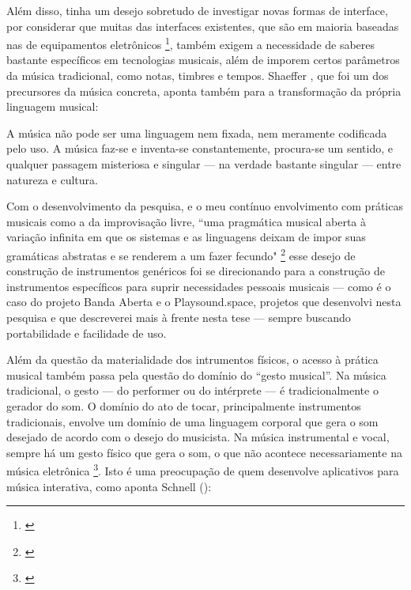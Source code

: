  Além disso, tinha um desejo sobretudo de investigar novas formas de interface, por considerar que muitas das interfaces existentes, que são em maioria baseadas nas de equipamentos eletrônicos \footnote{\cite{Stolfi2016}}, também exigem a necessidade de saberes bastante específicos em tecnologias musicais, além de imporem certos parâmetros da música tradicional, como notas, timbres e tempos. Shaeffer \citeyear{Schaeffer2007}, que foi um dos precursores da música concreta, aponta também para a transformação da própria linguagem musical: 


 \begin{citacao}
A música não pode ser uma linguagem nem fixada, nem meramente codificada pelo uso. A música faz-se e inventa-se constantemente, procura-se um sentido, e qualquer passagem misteriosa e singular — na verdade bastante singular — entre natureza e cultura. \cite{Schaeffer2007}
\end{citacao}

Com o desenvolvimento da pesquisa, e o meu contínuo envolvimento com práticas musicais como a da improvisação livre, ``uma pragmática musical aberta à variação infinita em que os sistemas e as linguagens deixam de impor suas gramáticas abstratas e se renderem a um fazer fecundo" \footnote{\cite[2]{Costa2016}} esse desejo de construção de instrumentos genéricos foi se direcionando para a construção de instrumentos específicos para suprir necessidades pessoais musicais --- como é o caso do projeto Banda Aberta e o Playsound.space, projetos que desenvolvi nesta pesquisa e que descreverei mais à frente nesta tese --- sempre buscando portabilidade e facilidade de uso. 


Além da questão da materialidade dos intrumentos físicos, o acesso à prática musical também passa pela questão do domínio do ``gesto musical''. Na música tradicional, o gesto --- do performer ou do intérprete --- é tradicionalmente o gerador do som. O domínio do ato de tocar, principalmente instrumentos tradicionais, envolve um domínio de uma linguagem corporal que gera o som desejado de acordo com o desejo do musicista. Na música instrumental e vocal, sempre há um gesto físico que gera o som, o que não acontece necessariamente na música eletrônica \footnote{\cite[85]{Smalley1996}}. Isto é uma preocupação de quem desenvolve aplicativos para música interativa, como aponta Schnell (\citeyear{Schnell2013}): 



